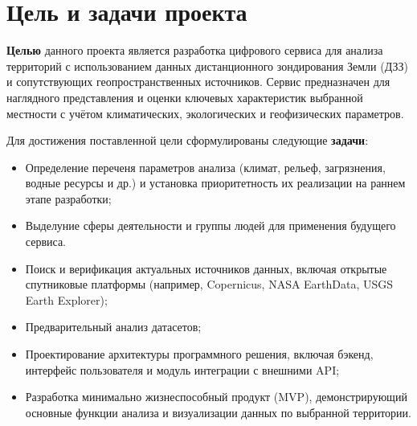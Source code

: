 \section{Цель и задачи проекта}

\textbf{Целью} данного проекта является разработка цифрового сервиса для анализа территорий с использованием данных дистанционного зондирования Земли (ДЗЗ) и сопутствующих геопространственных источников. Сервис предназначен для наглядного представления и оценки ключевых характеристик выбранной местности с учётом климатических, экологических и геофизических параметров.

Для достижения поставленной цели сформулированы следующие \textbf{задачи}:

\begin{itemize}
	\item Определение переченя параметров анализа (климат, рельеф, загрязнения, водные ресурсы и др.) и установка приоритетность их реализации на раннем этапе разработки;
	\item Выделуние сферы деятельности и группы людей для применения будущего сервиса.
	\item Поиск и верификация актуальных источников данных, включая открытые спутниковые платформы (например, Copernicus, NASA EarthData, USGS Earth Explorer);
	\item Предварительный анализ датасетов;
	\item Проектирование архитектуры программного решения, включая бэкенд, интерфейс пользователя и модуль интеграции с внешними API;
	\item Разработка минимально жизнеспособный продукт (MVP), демонстрирующий основные функции анализа и визуализации данных по выбранной территории.
\end{itemize}
